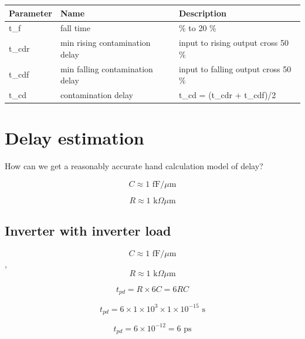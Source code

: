 \begin{longtable}[]{@{}
  >{\raggedright\arraybackslash}p{}
  >{\raggedright\arraybackslash}p{}
  >{\raggedright\arraybackslash}p{}@{}}
\toprule\noalign{}
\begin{minipage}[b]{\linewidth}\raggedright
Parameter
\end{minipage} & \begin{minipage}[b]{\linewidth}\raggedright
Name
\end{minipage} & \begin{minipage}[b]{\linewidth}\raggedright
Description
\end{minipage} \\
\midrule\noalign{}
\endhead
\bottomrule\noalign{}
\endlastfoot
t\_f & fall time & 80 \% to 20 \% \\
t\_cdr & min rising contamination delay & input to rising output cross
50 \% \\
t\_cdf & min falling contamination delay & input to falling output cross
50 \% \\
t\_cd & contamination delay & t\_cd = (t\_cdr + t\_cdf)/2 \\
\end{longtable}

\section{Delay estimation}\label{delay-estimation}

How can we get a reasonably accurate hand calculation model of delay?

\[ C \approx 1 \text{ fF}/\mu\text{m}\]

\[ R \approx 1 \text{ k}\Omega\mu\text{m}\]

\subsection{Inverter with inverter
load}\label{inverter-with-inverter-load}

\[ C \approx 1 \text{ fF}/\mu\text{m}\],
\[ R \approx 1 \text{ k}\Omega\mu\text{m}\]

\[ t_{pd} = R \times 6C  = 6RC \]

\[ t_{pd} = 6 \times 1 \times 10^{3} \times 1 \times 10^{-15} \text{ s}\]

\[ t_{pd} = 6 \times 10^{-12}  = 6 \text{ ps}\]

